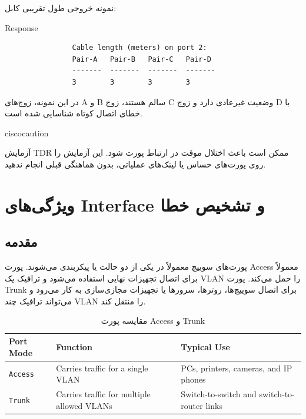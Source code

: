 \documentclass[11pt,letterpaper]{report}
\newenvironment{cautionbox}[1]{%
	\begin{noticebox}[title={\textbf{\faExclamationTriangle\ #1}}]{ciscocaution}
	}{%
	\end{noticebox}
}
\begin{document}
		نمونه خروجی طول تقریبی کابل:

		\begin{latin}
			\begin{cliexample}{Response}
				\begin{verbatim}
				Cable length (meters) on port 2:
				Pair-A   Pair-B   Pair-C   Pair-D
				-------  -------  -------  -------
				3        3        3        3
				\end{verbatim}
			\end{cliexample}
		\end{latin}

		در این نمونه، زوج‌های A و B سالم هستند، زوج C وضعیت غیرعادی
		دارد و زوج D با خطای اتصال کوتاه شناسایی شده است.

		\begin{cautionbox}{هشدار اجرای TDR}
			آزمایش TDR ممکن است باعث اختلال موقت در ارتباط پورت شود.
			این آزمایش را روی پورت‌های حساس یا لینک‌های عملیاتی، بدون
			هماهنگی قبلی انجام ندهید.
		\end{cautionbox}


		\iffalse

	\chapter{ویژگی‌های Interface و تشخیص خطا}

	\section{مقدمه}
			پورت‌های سوییچ معمولاً در یکی از دو حالت
		 یا  پیکربندی می‌شوند.
			پورت Access معمولاً برای اتصال تجهیزات نهایی استفاده می‌شود و
		ترافیک یک VLAN را حمل می‌کند. پورت Trunk برای اتصال سوییچ‌ها،		روترها، سرورها یا تجهیزات مجازی‌سازی به کار می‌رود و می‌تواند
		ترافیک چند VLAN را منتقل کند.

	\begin{table}[htbp]
		\centering
		\caption{مقایسه پورت Access و Trunk}
		\label{tab:access-trunk-comparison}
		\begin{tabular}{|p{3.0cm}|p{5.0cm}|p{4.7cm}|}
			\hline
			\textbf{Port Mode} &
			\textbf{Function} &
			\textbf{Typical Use} \\
			\hline
			\texttt{Access} &
			Carries traffic for a single VLAN &
			PCs, printers, cameras, and IP phones \\
			\hline
			\texttt{Trunk} &
			Carries traffic for multiple allowed VLANs &
			Switch-to-switch and switch-to-router links \\
			\hline
		\end{tabular}
	\end{table}
\end{document}
